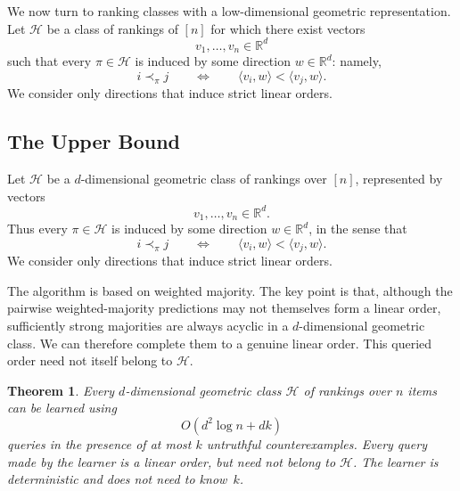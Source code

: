 \documentclass[11pt]{article}
\newtheorem{theorem}{Theorem}[section]
\theoremstyle{definition}
\theoremstyle{remark}
\begin{document}
We now turn to ranking classes with a low-dimensional geometric
representation. Let $\mathcal H$ be a class of rankings of $[n]$ for which
there exist vectors
\[
    v_1,\ldots,v_n\in\mathbb R^d
\]
such that every $\pi\in\mathcal H$ is induced by some direction
$w\in\mathbb R^d$: namely,
\[
    i\prec_\pi j
    \qquad\Longleftrightarrow\qquad
    \langle v_i,w\rangle<\langle v_j,w\rangle.
\]
We consider only directions that induce strict linear orders.

\subsection{The Upper Bound}
\label{sec:geometric-upper}

Let $\mathcal H$ be a $d$-dimensional geometric class of rankings over
$[n]$, represented by vectors
\[
    v_1,\ldots,v_n\in\mathbb R^d.
\]
Thus every $\pi\in\mathcal H$ is induced by some direction
$w\in\mathbb R^d$, in the sense that
\[
    i\prec_\pi j
    \qquad\Longleftrightarrow\qquad
    \langle v_i,w\rangle<\langle v_j,w\rangle.
\]
We consider only directions that induce strict linear orders.

The algorithm is based on weighted majority. The key point is that, although
the pairwise weighted-majority predictions may not themselves form a linear
order, sufficiently strong majorities are always acyclic in a
$d$-dimensional geometric class. We can therefore complete them to a genuine
linear order. This queried order need not itself belong to $\mathcal H$.

\begin{theorem}
\label{thm:geometric-upper}
Every $d$-dimensional geometric class $\mathcal H$ of rankings over $n$
items can be learned using
\[
    O(d^2\log n+dk)
\]
queries in the presence of at most $k$ untruthful counterexamples. Every
query made by the learner is a linear order, but need not belong to
$\mathcal H$. The learner is deterministic and does not need to know~$k$.
\end{theorem}
\end{document}
